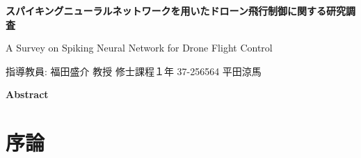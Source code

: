 \documentclass[a4paper,10.5pt,twocolumn]{bxjsarticle}
\begin{document}
\thispagestyle{fancy}

\begin{center}
  {\LARGE \bfseries スパイキングニューラルネットワークを用いたドローン飛行制御に関する研究調査 \par}
  \vspace{2mm}
  {\large A Survey on Spiking Neural Network for Drone Flight Control \par}
\end{center}

\vspace{5mm}

\noindent
指導教員: 福田盛介 教授
\hfill
修士課程１年 37-256564 平田涼馬

\vspace{10mm}

\begin{center}
  \bfseries Abstract
\end{center}
\lipsum[1] %

\vspace{5mm}

\section{序論}


\section{}
\bxjlipsum[2-4] %

\section{}
\bxjlipsum[5-7] %


\end{document}
